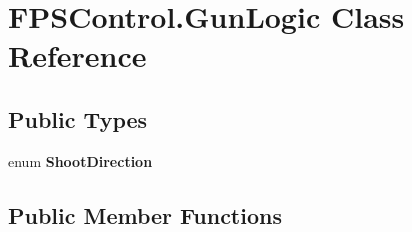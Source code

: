 \hypertarget{class_f_p_s_control_1_1_gun_logic}{\section{F\-P\-S\-Control.\-Gun\-Logic Class Reference}
\label{class_f_p_s_control_1_1_gun_logic}
}
\subsection*{Public Types}
\begin{DoxyCompactItemize}
\item 
enum {\bfseries Shoot\-Direction} 
\end{DoxyCompactItemize}
\subsection*{Public Member Functions}
